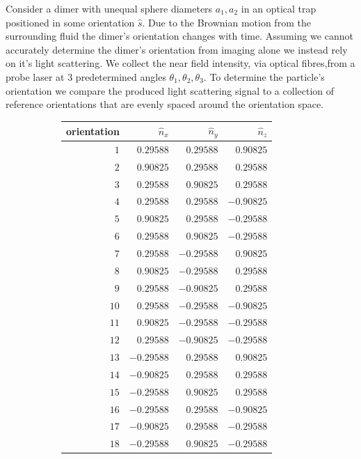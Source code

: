 \documentclass[11pt]{article}
\begin{document}
Consider a dimer with unequal sphere diameters $a_1, a_2$ in an optical trap positioned in some orientation $\hat{s}$. Due to the Brownian motion from the surrounding fluid the dimer's orientation changes with time. Assuming we cannot accurately determine the dimer's orientation from imaging alone we instead rely on it's light scattering. We collect the near field intensity, via optical fibres,from a probe laser at 3 predetermined angles $\theta_1, \theta_2, \theta_3$. To determine the particle's orientation we compare the produced light scattering signal to a collection of reference orientations that are evenly spaced around the orientation space.   
\begin{figure}
	\begin{subfigure}{0.45\textwidth}
			\begin{tabular}{rrrr}
				\hline\hline
				orientation & $\hat{n}_x$ &  $\hat{n}_y$ &  $\hat{n}_z$ \\
				\hline
				$1$ & $ 0.29588$ &  $ 0.29588$ & $ 0.90825$ \\
				$2$ & $ 0.90825$ &  $ 0.29588$ & $ 0.29588$ \\
				$3$ & $ 0.29588$ &  $ 0.90825$ & $ 0.29588$ \\
				$4$ & $ 0.29588$ &  $ 0.29588$ & $-0.90825$ \\
				$5$ & $ 0.90825$ &  $ 0.29588$ & $-0.29588$ \\
				$6$ & $ 0.29588$ &  $ 0.90825$ & $-0.29588$ \\
				$7$ & $ 0.29588$ &  $-0.29588$ & $ 0.90825$ \\
				$8$ & $ 0.90825$ &  $-0.29588$ & $ 0.29588$ \\
				$9$ & $ 0.29588$ &  $-0.90825$ & $ 0.29588$ \\
				$10$ & $ 0.29588$ &  $-0.29588$ & $-0.90825$ \\
				$11$ & $ 0.90825$ &  $-0.29588$ & $-0.29588$ \\
				$12$ & $ 0.29588$ &  $-0.90825$ & $-0.29588$ \\
				$13$ & $-0.29588$ &  $ 0.29588$ & $ 0.90825$ \\
				$14$ & $-0.90825$ &  $ 0.29588$ & $ 0.29588$ \\
				$15$ & $-0.29588$ &  $ 0.90825$ & $ 0.29588$ \\
				$16$ & $-0.29588$ &  $ 0.29588$ & $-0.90825$ \\
				$17$ & $-0.90825$ &  $ 0.29588$ & $-0.29588$ \\
				$18$ & $-0.29588$ &  $ 0.90825$ & $-0.29588$ \\

\end{tabular}
\end{subfigure}
\end{figure}
\end{document}
